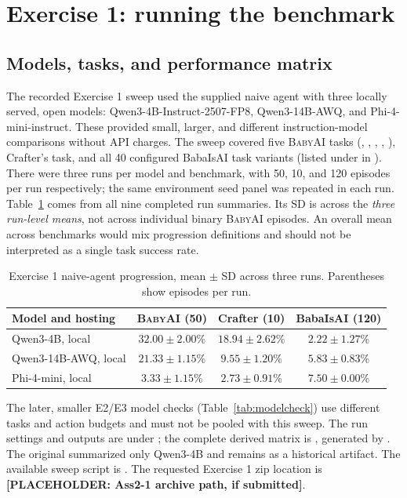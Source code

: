 \documentclass[11pt,a4paper]{article}
\newcommand{\missing}[1]{\textbf{[PLACEHOLDER: #1]}}
\newcommand{\BabyAI}{\textsc{BabyAI}}
\begin{document}
\section{Exercise 1: running the benchmark}

\subsection{Models, tasks, and performance matrix}

The recorded Exercise 1 sweep used the supplied naive agent with three locally served, open models: Qwen3-4B-Instruct-2507-FP8, Qwen3-14B-AWQ, and Phi-4-mini-instruct. These provided small, larger, and different instruction-model comparisons without API charges. The sweep covered five \BabyAI{} tasks (, , , , ), Crafter's  task, and all 40 configured BabaIsAI task variants (listed under  in ). There were three runs per model and benchmark, with 50, 10, and 120 episodes per run respectively; the same environment seed panel was repeated in each run. Table~\ref{tab:e1} comes from all nine completed run summaries. Its SD is across the \emph{three run-level means}, not across individual binary \BabyAI{} episodes. An overall mean across benchmarks would mix progression definitions and should not be interpreted as a single task success rate.

\begin{table}[htbp]
\centering
\caption{Exercise 1 naive-agent progression, mean $\pm$ SD across three runs. Parentheses show episodes per run.}
\label{tab:e1}
\small
\begin{tabular}{@{}lccc@{}}
\toprule
Model and hosting & \BabyAI{} (50) & Crafter (10) & BabaIsAI (120) \\
\midrule
Qwen3-4B, local & $32.00\pm2.00$\% & $18.94\pm2.62$\% & $2.22\pm1.27$\% \\
Qwen3-14B-AWQ, local & $21.33\pm1.15$\% & $9.55\pm1.20$\% & $5.83\pm0.83$\% \\
Phi-4-mini, local & $3.33\pm1.15$\% & $2.73\pm0.91$\% & $7.50\pm0.00$\% \\
\bottomrule
\end{tabular}
\end{table}

The later, smaller E2/E3 model checks (Table~\ref{tab:modelcheck}) use different tasks and action budgets and must not be pooled with this sweep. The run settings and outputs are under ; the complete derived matrix is , generated by . The original  summarized only Qwen3-4B and remains as a historical artifact. The available sweep script is . The requested Exercise 1 zip location is \missing{Ass2-1 archive path, if submitted}.
\end{document}

